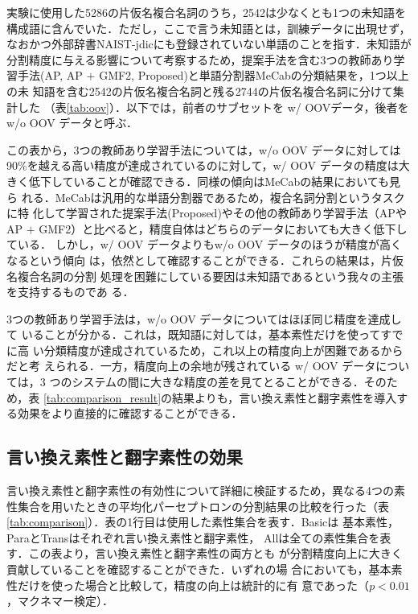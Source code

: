 \documentclass[japanese]{jnlp_1.4}
\begin{document}
実験に使用した5286の片仮名複合名詞のうち，2542は少なくとも1つの未知語を
構成語に含んでいた．ただし，ここで言う未知語とは，訓練データに出現せず，
なおかつ外部辞書NAIST-jdicにも登録されていない単語のことを指す．未知語が
分割精度に与える影響について考察するため，提案手法を含む3つの教師あり学
習手法(AP, AP $+$ GMF2, Proposed)と単語分割器MeCabの分類結果を，1つ以上の未
知語を含む2542の片仮名複合名詞と残る2744の片仮名複合名詞に分けて集計した
（表\ref{tab:oov}）．以下では，前者のサブセットを w/ OOVデータ，後者を w/o
OOV データと呼ぶ．

\begin{table}[b]
\label{tab:oov}

\end{table}

この表から，3つの教師あり学習手法については，w/o OOV データに対しては
90\%を越える高い精度が達成されているのに対して，w/ OOV データの精度は大
きく低下していることが確認できる．同様の傾向はMeCabの結果においても見ら
れる．MeCabは汎用的な単語分割器であるため，複合名詞分割というタスクに特
化して学習された提案手法(Proposed)やその他の教師あり学習手法（APや
AP $+$ GMF2）と比べると，精度自体はどちらのデータにおいても大きく低下している．
しかし，w/ OOV データよりもw/o OOV データのほうが精度が高くなるという傾向
は，依然として確認することができる．これらの結果は，片仮名複合名詞の分割
処理を困難にしている要因は未知語であるという我々の主張を支持するものであ
る．

3つの教師あり学習手法は，w/o OOV データについてはほぼ同じ精度を達成して
いることが分かる．これは，既知語に対しては，基本素性だけを使ってすでに高
い分類精度が達成されているため，これ以上の精度向上が困難であるからだと考
えられる．一方，精度向上の余地が残されている w/ OOV データについては，3
つのシステムの間に大きな精度の差を見てとることができる．そのため，表
\ref{tab:comparison_result}の結果よりも，言い換え素性と翻字素性を導入す
る効果をより直接的に確認することができる．



\subsection{言い換え素性と翻字素性の効果}
 \label{sec:effect}

言い換え素性と翻字素性の有効性について詳細に検証するため，異なる4つの素
性集合を用いたときの平均化パーセプトロンの分割結果の比較を行った（表
\ref{tab:comparison}）．表の1行目は使用した素性集合を表す．{\sc Basic}は
基本素性，{\sc Para}と{\sc Trans}はそれぞれ言い換え素性と翻字素性，{\sc
All}は全ての素性集合を表す．この表より，言い換え素性と翻字素性の両方とも
が分割精度向上に大きく貢献していることを確認することができた．いずれの場
合においても，基本素性だけを使った場合と比較して，精度の向上は統計的に有
意であった（$p<0.01$，マクネマー検定）．
\end{document}
